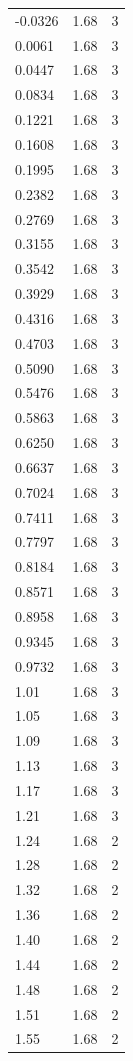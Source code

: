 \begin{longtable}{lrr}
  -0.0326 & 1.68 & 3 \\
  0.0061 & 1.68 & 3 \\
  0.0447 & 1.68 & 3 \\
  0.0834 & 1.68 & 3 \\
  0.1221 & 1.68 & 3 \\
  0.1608 & 1.68 & 3 \\
  0.1995 & 1.68 & 3 \\
  0.2382 & 1.68 & 3 \\
  0.2769 & 1.68 & 3 \\
  0.3155 & 1.68 & 3 \\
  0.3542 & 1.68 & 3 \\
  0.3929 & 1.68 & 3 \\
  0.4316 & 1.68 & 3 \\
  0.4703 & 1.68 & 3 \\
  0.5090 & 1.68 & 3 \\
  0.5476 & 1.68 & 3 \\
  0.5863 & 1.68 & 3 \\
  0.6250 & 1.68 & 3 \\
  0.6637 & 1.68 & 3 \\
  0.7024 & 1.68 & 3 \\
  0.7411 & 1.68 & 3 \\
  0.7797 & 1.68 & 3 \\
  0.8184 & 1.68 & 3 \\
  0.8571 & 1.68 & 3 \\
  0.8958 & 1.68 & 3 \\
  0.9345 & 1.68 & 3 \\
  0.9732 & 1.68 & 3 \\
  1.01 & 1.68 & 3 \\
  1.05 & 1.68 & 3 \\
  1.09 & 1.68 & 3 \\
  1.13 & 1.68 & 3 \\
  1.17 & 1.68 & 3 \\
  1.21 & 1.68 & 3 \\
  1.24 & 1.68 & 2 \\
  1.28 & 1.68 & 2 \\
  1.32 & 1.68 & 2 \\
  1.36 & 1.68 & 2 \\
  1.40 & 1.68 & 2 \\
  1.44 & 1.68 & 2 \\
  1.48 & 1.68 & 2 \\
  1.51 & 1.68 & 2 \\
  1.55 & 1.68 & 2 \\

\end{longtable}
